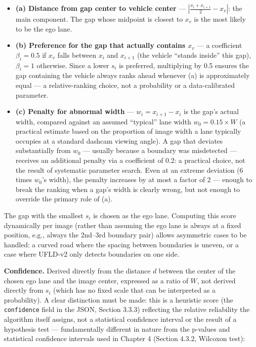 \documentclass[12pt,a4paper]{report}
\begin{document}
\begin{itemize}
    \item \textbf{(a) Distance from gap center to vehicle center} --- $\left|\frac{x_i+x_{i+1}}{2} - x_v\right|$: the main component. The gap whose midpoint is closest to $x_v$ is the most likely to be the ego lane.
    \item \textbf{(b) Preference for the gap that actually contains $x_v$} --- a coefficient $\beta_i=0.5$ if $x_v$ falls between $x_i$ and $x_{i+1}$ (the vehicle ``stands inside'' this gap), $\beta_i=1$ otherwise. Since a lower $s_i$ is preferred, multiplying by 0.5 ensures the gap containing the vehicle always ranks ahead whenever (a) is approximately equal --- a relative-ranking choice, not a probability or a data-calibrated parameter.
    \item \textbf{(c) Penalty for abnormal width} --- $w_i = x_{i+1}-x_i$ is the gap's actual width, compared against an assumed ``typical'' lane width $w_0 = 0.15 \times W$ (a practical estimate based on the proportion of image width a lane typically occupies at a standard dashcam viewing angle). A gap that deviates substantially from $w_0$ --- usually because a boundary was misdetected --- receives an additional penalty via a coefficient of 0.2: a practical choice, not the result of systematic parameter search. Even at an extreme deviation (6 times $w_0$'s width), the penalty increases by at most a factor of 2 --- enough to break the ranking when a gap's width is clearly wrong, but not enough to override the primary role of (a).
\end{itemize}

The gap with the smallest $s_i$ is chosen as the ego lane. Computing this score dynamically per image (rather than assuming the ego lane is always at a fixed position, e.g., always the 2nd--3rd boundary pair) allows asymmetric cases to be handled: a curved road where the spacing between boundaries is uneven, or a case where UFLD-v2 only detects boundaries on one side.

\textbf{Confidence.} Derived directly from the distance $d$ between the center of the chosen ego lane and the image center, expressed as a ratio of $W$, not derived directly from $s_i$ (which has no fixed scale that can be interpreted as a probability). A clear distinction must be made: this is a heuristic score (the \texttt{confidence} field in the JSON, Section 3.3.3) reflecting the relative reliability the algorithm itself assigns, not a statistical confidence interval or the result of a hypothesis test --- fundamentally different in nature from the p-values and statistical confidence intervals used in Chapter 4 (Section 4.3.2, Wilcoxon test):
\end{document}
